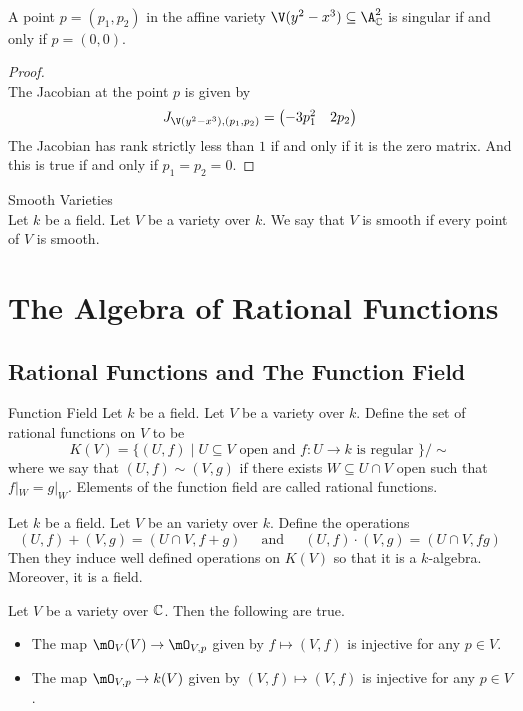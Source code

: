 \documentclass[a4paper]{article}
\begin{document}
\begin{eg}{}{}\\
A point $p=(p_1,p_2)$ in the affine variety $\V(y^2-x^3)\subseteq\A_\C^2$ is singular if and only if $p=(0,0)$. 
\begin{proof}\\
The Jacobian at the point $p$ is given by $$J_{\V(y^2-x^3),(p_1,p_2)}=\begin{pmatrix}
-3p_1^2 & 2p_2
\end{pmatrix}$$
The Jacobian has rank strictly less than $1$ if and only if it is the zero matrix. And this is true if and only if $p_1=p_2=0$. 
\end{proof}
\end{eg}

\begin{defn}{Smooth Varieties}{}\\
Let $k$ be a field. Let $V$ be a variety over $k$. We say that $V$ is smooth if every point of $V$ is smooth. 
\end{defn}

\pagebreak
\section{The Algebra of Rational Functions}
\subsection{Rational Functions and The Function Field}
\begin{defn}{Function Field}{} Let $k$ be a field. Let $V$ be a variety over $k$. Define the set of rational functions on $V$ to be $$K(V)=\{(U,f)\;|\;U\subseteq V\text{ open and }f:U\to k\text{ is regular }\}/\sim$$ where we say that $(U,f)\sim(V,g)$ if there exists $W\subseteq U\cap V$ open such that $f|_W=g|_W$. Elements of the function field are called rational functions. 
\end{defn}

\begin{lmm}{}{} Let $k$ be a field. Let $V$ be an variety over $k$. Define the operations $$(U,f)+(V,g)=(U\cap V,f+g)\;\;\;\;\text{ and }\;\;\;\;(U,f)\cdot(V,g)=(U\cap V,fg)$$ Then they induce well defined operations on $K(V)$ so that it is a $k$-algebra. Moreover, it is a field. 
\end{lmm}

\begin{lmm}{}{} Let $V$ be a variety over $\mathbb{C}$. Then the following are true. 
\begin{itemize}
\item The map $\mO_V(V)\to\mO_{V,p}$ given by $f\mapsto(V,f)$ is injective for any $p\in V$. 
\item The map $\mO_{V,p}\to k(V)$ given by $(V,f)\mapsto(V,f)$ is injective for any $p\in V$. 
\end{itemize}
\end{lmm}
\end{document}
